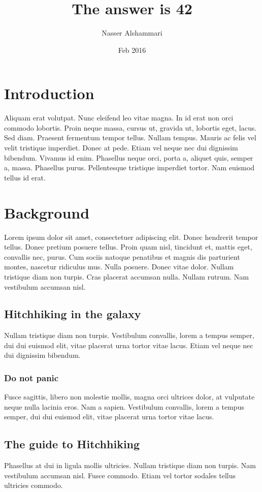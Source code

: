 \documentclass{article}
\title{The answer is 42}
\author{Nasser Alshammari}
\date{Feb 2016}
\begin{document}
\maketitle

\section{Introduction}
Aliquam erat volutpat.  Nunc eleifend leo vitae magna.  In id erat non orci commodo lobortis.  Proin neque massa, cursus ut, gravida ut, lobortis eget, lacus.  Sed diam.  Praesent fermentum tempor tellus.  Nullam tempus.  Mauris ac felis vel velit tristique imperdiet.  Donec at pede.  Etiam vel neque nec dui dignissim bibendum.  Vivamus id enim.  Phasellus neque orci, porta a, aliquet quis, semper a, massa.  Phasellus purus.  Pellentesque tristique imperdiet tortor.  Nam euismod tellus id erat.


\section{Background}
Lorem ipsum dolor sit amet, consectetuer adipiscing elit.  Donec hendrerit tempor tellus.  Donec pretium posuere tellus.  Proin quam nisl, tincidunt et, mattis eget, convallis nec, purus.  Cum sociis natoque penatibus et magnis dis parturient montes, nascetur ridiculus mus.  Nulla posuere.  Donec vitae dolor.  Nullam tristique diam non turpis.  Cras placerat accumsan nulla.  Nullam rutrum.  Nam vestibulum accumsan nisl.

\subsection{Hitchhiking in the galaxy}
Nullam tristique diam non turpis. Vestibulum convallis, lorem a tempus semper, dui dui euismod elit, vitae placerat urna tortor vitae lacus.  Etiam vel neque nec dui dignissim bibendum. 

\subsubsection{Do not panic}
Fusce sagittis, libero non molestie mollis, magna orci ultrices dolor, at vulputate neque nulla lacinia eros. Nam a sapien.  Vestibulum convallis, lorem a tempus semper, dui dui euismod elit, vitae placerat urna tortor vitae lacus.   

\subsection{The guide to Hitchhiking}
Phasellus at dui in ligula mollis ultricies. Nullam tristique diam non turpis.  Nam vestibulum accumsan nisl.  Fusce commodo.  Etiam vel tortor sodales tellus ultricies commodo.   
\end{document}
